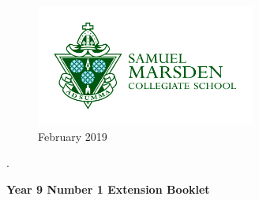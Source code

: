 \documentclass[a4paper,12pt]{article}
\begin{document}
\thispagestyle{empty}	
\Large
\begin{figure} 
	\centering
	\includegraphics[height=4cm]{Marsden_green_on_white.jpg}
	\caption*{February 2019}
\end{figure}
.
\vspace{3cm}
\begin{center}
	\textbf{Year 9 Number 1 Extension Booklet}
\end{center}

\vspace{3cm}

\normalsize
\newpage
\tableofcontents
\newpage
\end{document}
